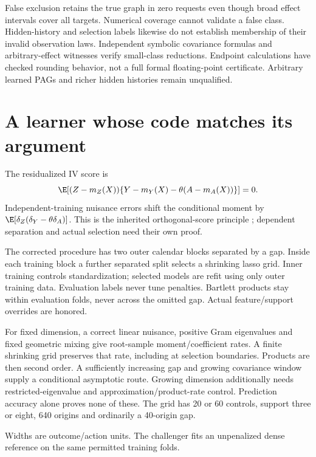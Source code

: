 False exclusion retains the true graph in zero requests even though broad effect intervals cover all targets. Numerical coverage cannot validate a false class. Hidden-history and selection labels likewise do not establish membership of their invalid observation laws. Independent symbolic covariance formulas and arbitrary-effect witnesses verify small-class reductions. Endpoint calculations have checked rounding behavior, not a full formal floating-point certificate. Arbitrary learned PAGs and richer hidden histories remain unqualified.

\section{A learner whose code matches its argument}
The residualized IV score is
\[
 \E[(Z-m_Z(X))\{Y-m_Y(X)-\theta(A-m_A(X))\}]=0.
\]
Independent-training nuisance errors shift the conditional moment by $\E[\delta_Z(\delta_Y-\theta\delta_A)]$. This is the inherited orthogonal-score principle \cite{dml2018}; dependent separation and actual selection need their own proof.

The corrected procedure has two outer calendar blocks separated by a gap. Inside each training block a further separated split selects a shrinking lasso grid. Inner training controls standardization; selected models are refit using only outer training data. Evaluation labels never tune penalties. Bartlett products stay within evaluation folds, never across the omitted gap. Actual feature/support overrides are honored.

For fixed dimension, a correct linear nuisance, positive Gram eigenvalues and fixed geometric mixing give root-sample moment/coefficient rates. A finite shrinking grid preserves that rate, including at selection boundaries. Products are then second order. A sufficiently increasing gap and growing covariance window supply a conditional asymptotic route. Growing dimension additionally needs restricted-eigenvalue and approximation/product-rate control. Prediction accuracy alone proves none of these. The grid has 20 or 60 controls, support three or eight, 640 origins and ordinarily a 40-origin gap.

Widths are outcome/action units. The challenger fits an unpenalized dense reference on the same permitted training folds.

